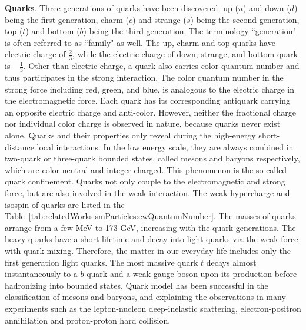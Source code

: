 \textbf{Quarks}. Three generations of quarks have been discovered: up ($u$) and down ($d$) being the first generation, charm ($c$) and strange ($s$) being the second generation, top ($t$) and bottom ($b$) being the third generation. The terminology ``generation" is often referred to as ``family" as well. The up, charm and top quarks have electric charge of $\frac{2}{3}$, while the electric charge of down, strange, and bottom quark is $-\frac{1}{3}$. Other than electric charge, a quark also carries color quantum number and thus participates in the strong interaction. The color quantum number in the strong force including red, green, and blue, is analogous to the electric charge in the electromagnetic force. Each quark has its corresponding antiquark carrying an opposite electric charge and anti-color. However, neither the fractional charge nor individual color charge is observed in nature, because quarks never exist alone. Quarks and their properties only reveal during the high-energy short-distance local interactions. In the low energy scale, they are always combined in two-quark or three-quark bounded states, called mesons and baryons respectively, which are color-neutral and integer-charged. This phenomenon is the so-called quark confinement. Quarks not only couple to the electromagnetic and strong force, but are also involved in the weak interaction. The weak hypercharge and isospin of quarks are listed in the Table~\ref{tab:relatedWorks:smParticles:ewQuantumNumber}. The masses of quarks arrange from a few MeV to 173 GeV, increasing with the quark generations. The heavy quarks have a short lifetime and decay into light quarks via the weak force with quark mixing. Therefore, the matter in our everyday life includes only the first generation light quarks. The most massive quark $t$ decays almost instantaneously to a $b$ quark and a weak gauge boson upon its production before hadronizing into bounded states. Quark model has been successful in the classification of mesons and baryons, and explaining the observations in many experiments such as the lepton-nucleon deep-inelastic scattering, electron-positron annihilation and proton-proton hard collision.



